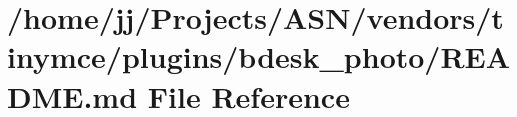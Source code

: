 \hypertarget{vendors_2tinymce_2plugins_2bdesk__photo_2_r_e_a_d_m_e_8md}{}\section{/home/jj/\+Projects/\+A\+S\+N/vendors/tinymce/plugins/bdesk\+\_\+photo/\+R\+E\+A\+D\+ME.md File Reference}
\label{vendors_2tinymce_2plugins_2bdesk__photo_2_r_e_a_d_m_e_8md}

